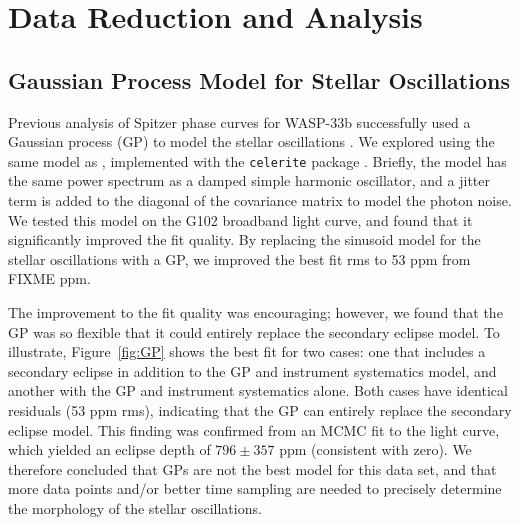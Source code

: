 \documentclass[twocolumn]{aastex62}
\begin{document}
\section{Data Reduction and Analysis} \label{sec:reduction}

\subsection{Gaussian Process Model for Stellar Oscillations}
Previous analysis of Spitzer phase curves for WASP-33b successfully used a Gaussian process (GP) to model the stellar oscillations \citep{zhang17}. We explored using the same model as \cite{zhang17}, implemented with the \texttt{celerite} package \citep{foremanmackey17}. Briefly, the model has the same power spectrum as a damped simple harmonic oscillator, and a jitter term is added to the diagonal of the covariance matrix to model the photon noise.  We tested this model on the G102 broadband light curve, and found that it significantly improved the fit quality. By replacing the sinusoid model for the stellar oscillations with a GP, we improved the best fit rms to 53 ppm from FIXME ppm.

The improvement to the fit quality was encouraging; however, we found that the GP was so flexible that it could entirely replace the secondary eclipse model. To illustrate, Figure~\ref{fig:GP} shows the best fit for two cases: one that includes a secondary eclipse in addition to the GP and instrument systematics model, and another with the GP and instrument systematics alone. Both cases have identical residuals (53 ppm rms), indicating that the GP can entirely replace the secondary eclipse model. This finding was confirmed from an MCMC fit to the light curve, which yielded an eclipse depth of $796 \pm 357$ ppm (consistent with zero).  We therefore concluded that GPs are not the best model for this data set, and that more data points and/or better time sampling are needed to precisely determine the morphology of the stellar oscillations.
\end{document}

